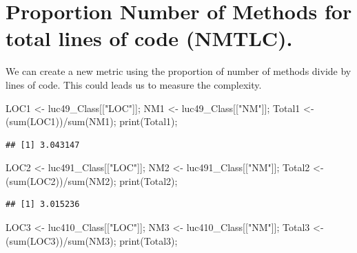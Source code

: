 \documentclass[
]{article}
\newenvironment{Shaded}{\begin{snugshade}}{\end{snugshade}}
\newcommand{\FunctionTok}[1]{\textcolor[rgb]{0.00,0.00,0.00}{#1}}
\newcommand{\NormalTok}[1]{#1}
\newcommand{\OtherTok}[1]{\textcolor[rgb]{0.56,0.35,0.01}{#1}}
\newcommand{\SpecialCharTok}[1]{\textcolor[rgb]{0.00,0.00,0.00}{#1}}
\newcommand{\StringTok}[1]{\textcolor[rgb]{0.31,0.60,0.02}{#1}}
\begin{document}
\hypertarget{proportion-number-of-methods-for-total-lines-of-code-nmtlc.}{%
\section{Proportion Number of Methods for total lines of code
(NMTLC).}\label{proportion-number-of-methods-for-total-lines-of-code-nmtlc.}}

We can create a new metric using the proportion of number of methods
divide by lines of code. This could leads us to measure the complexity.

\begin{Shaded}
\begin{Highlighting}[]
\NormalTok{LOC1 }\OtherTok{\textless{}{-}}\NormalTok{ luc49\_Class[[}\StringTok{"LOC"}\NormalTok{]];}
\NormalTok{NM1 }\OtherTok{\textless{}{-}}\NormalTok{ luc49\_Class[[}\StringTok{"NM"}\NormalTok{]];}
\NormalTok{Total1 }\OtherTok{\textless{}{-}}\NormalTok{ (}\FunctionTok{sum}\NormalTok{(LOC1))}\SpecialCharTok{/}\FunctionTok{sum}\NormalTok{(NM1);}
\FunctionTok{print}\NormalTok{(Total1);}
\end{Highlighting}
\end{Shaded}

\begin{verbatim}
## [1] 3.043147
\end{verbatim}

\begin{Shaded}
\begin{Highlighting}[]
\NormalTok{LOC2 }\OtherTok{\textless{}{-}}\NormalTok{ luc491\_Class[[}\StringTok{"LOC"}\NormalTok{]];}
\NormalTok{NM2 }\OtherTok{\textless{}{-}}\NormalTok{ luc491\_Class[[}\StringTok{"NM"}\NormalTok{]];}
\NormalTok{Total2 }\OtherTok{\textless{}{-}}\NormalTok{ (}\FunctionTok{sum}\NormalTok{(LOC2))}\SpecialCharTok{/}\FunctionTok{sum}\NormalTok{(NM2);}
\FunctionTok{print}\NormalTok{(Total2);}
\end{Highlighting}
\end{Shaded}

\begin{verbatim}
## [1] 3.015236
\end{verbatim}

\begin{Shaded}
\begin{Highlighting}[]
\NormalTok{LOC3 }\OtherTok{\textless{}{-}}\NormalTok{ luc410\_Class[[}\StringTok{"LOC"}\NormalTok{]];}
\NormalTok{NM3 }\OtherTok{\textless{}{-}}\NormalTok{ luc410\_Class[[}\StringTok{"NM"}\NormalTok{]];}
\NormalTok{Total3 }\OtherTok{\textless{}{-}}\NormalTok{ (}\FunctionTok{sum}\NormalTok{(LOC3))}\SpecialCharTok{/}\FunctionTok{sum}\NormalTok{(NM3);}
\FunctionTok{print}\NormalTok{(Total3);}
\end{Highlighting}
\end{Shaded}
\end{document}
